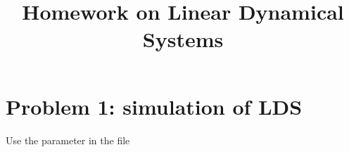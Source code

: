 \documentclass{article}
\title{Homework on Linear Dynamical Systems}
\author{}
\date{}
\begin{document}
\section*{Problem 1: simulation of LDS}

Use the parameter in the file 
\end{document}
